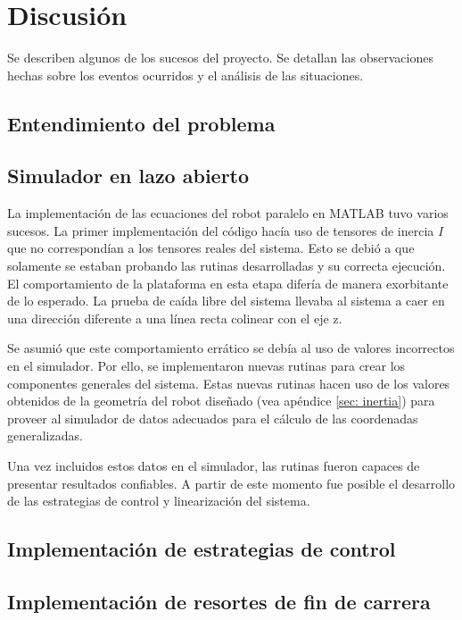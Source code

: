 \section{Discusión}
Se describen algunos de los sucesos del proyecto.
Se detallan las observaciones hechas sobre los eventos ocurridos y
el análisis de las situaciones.

\subsection{Entendimiento del problema}


\subsection{Simulador en lazo abierto}
La implementación de las ecuaciones del robot paralelo en 
MATLAB tuvo varios sucesos.
La primer implementación del código hacía uso de tensores de 
inercia $I$ que no correspondían a los tensores reales del sistema.
Esto se debió a que solamente se estaban probando las
rutinas desarrolladas y su correcta ejecución.
El comportamiento de la plataforma en esta etapa difería 
de manera exorbitante de lo esperado.
La prueba de caída libre del sistema llevaba al sistema a caer en 
una dirección diferente a una línea recta colinear con el eje z.

Se asumió que este comportamiento errático se debía al uso de 
valores incorrectos en el simulador.
Por ello, se implementaron nuevas rutinas para 
crear los componentes generales del sistema.
Estas nuevas rutinas hacen uso de los valores obtenidos de la
geometría del robot diseñado (vea apéndice \ref{sec: inertia})
para proveer al simulador de datos adecuados para
el cálculo de las coordenadas generalizadas.

Una vez incluidos estos datos en el simulador, 
las rutinas fueron capaces de 
presentar resultados confiables.
A partir de este momento fue posible el desarrollo
de las estrategias de control y 
linearización del sistema.

\subsection{Implementación de estrategias de control}




\subsection{Implementación de resortes de fin de carrera}
